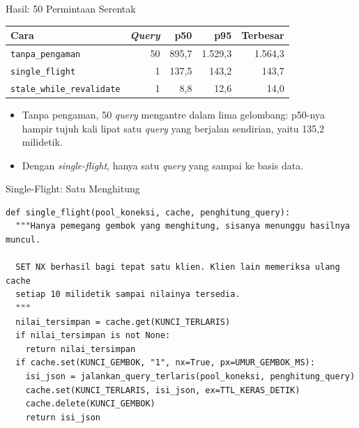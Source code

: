 \documentclass[aspectratio=169, table, 12pt]{beamer}
\begin{document}
\begin{frame}{{\Large Hasil: 50 Permintaan Serentak}}
  \vspace{4pt}
  \centering
  {\small
  \begin{tabularx}{\textwidth}{Xrrrr}
    \hline
    \textbf{Cara} & \textbf{\textit{Query}} & \textbf{p50} & \textbf{p95} & \textbf{Terbesar} \\
    \hline
    \texttt{tanpa\_pengaman} & 50 & 895,7 & 1.529,3 & 1.564,3 \\
    \hline
    \texttt{single\_flight} & 1 & 137,5 & 143,2 & 143,7 \\
    \hline
    \texttt{stale\_while\_revalidate} & 1 & 8,8 & 12,6 & 14,0 \\
    \hline
  \end{tabularx}}

  \vspace{6pt}
  \begin{itemize}
    \item Tanpa pengaman, 50 \textit{query} mengantre dalam lima gelombang: p50-nya
          hampir tujuh kali lipat satu \textit{query} yang berjalan sendirian, yaitu
          135,2 milidetik.
    \item Dengan \textit{single-flight}, hanya satu \textit{query} yang sampai ke basis
          data.
  \end{itemize}
\end{frame}

\begin{frame}[fragile]{{\Large Single-Flight: Satu Menghitung}}
  \vspace{2pt}
\begin{lstlisting}[style=PythonStyle]
def single_flight(pool_koneksi, cache, penghitung_query):
  """Hanya pemegang gembok yang menghitung, sisanya menunggu hasilnya muncul.

  SET NX berhasil bagi tepat satu klien. Klien lain memeriksa ulang cache
  setiap 10 milidetik sampai nilainya tersedia.
  """
  nilai_tersimpan = cache.get(KUNCI_TERLARIS)
  if nilai_tersimpan is not None:
    return nilai_tersimpan
  if cache.set(KUNCI_GEMBOK, "1", nx=True, px=UMUR_GEMBOK_MS):
    isi_json = jalankan_query_terlaris(pool_koneksi, penghitung_query)
    cache.set(KUNCI_TERLARIS, isi_json, ex=TTL_KERAS_DETIK)
    cache.delete(KUNCI_GEMBOK)
    return isi_json
\end{lstlisting}
\end{frame}
\end{document}
